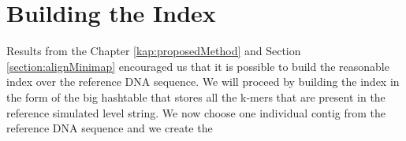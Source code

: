 \section{Building the Index}

Results from the Chapter \ref{kap:proposedMethod} and Section \ref{section:alignMinimap}
encouraged us that it is possible to build the reasonable index over the reference
DNA sequence. We will proceed by building the index in the form of the big hashtable
that stores all the k-mers that are present in the reference simulated level string.
We now choose one individual contig from the reference DNA sequence and we create
the
